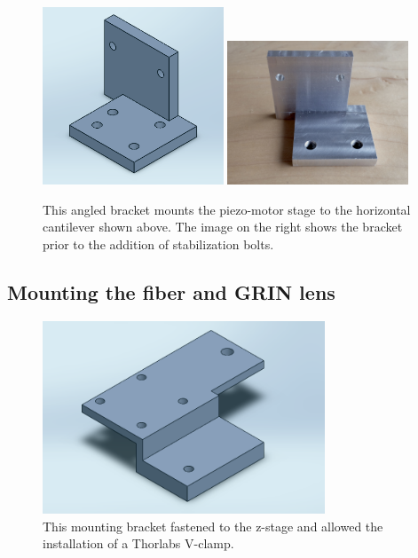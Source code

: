 \begin{figure}[h!]
\centering
\includegraphics[width=0.48\textwidth]{Images/Alignment/angle_bracket2.png}
\includegraphics[width=0.48\textwidth]{Images/Alignment/angle_bracket.jpg}
\caption{This angled bracket mounts the piezo-motor stage to the horizontal cantilever shown above. The image on the right shows the bracket prior to the addition of stabilization bolts.}
\end{figure}

\subsection{Mounting the fiber and GRIN lens}

\begin{figure}[h!]
\centering
\includegraphics[width=0.75\textwidth]{Images/Alignment/mounting_plate.png}
\caption{This mounting bracket fastened to the z-stage and allowed the installation of a Thorlabs V-clamp.}
\end{figure}

